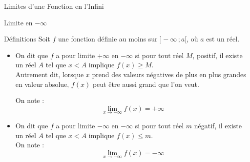 \documentclass{cours}
\begin{document}
\begin{Gpartie}{Limites d'une Fonction en l'Infini}
        \begin{Spartie}{Limite en $-\infty$} 
            \begin{SSpartie}{Définitions}
                Soit $f$ une fonction définie au moins sur $\big]-\infty\,;a\big[$, où $a$ est un réel.
                \begin{itemize}
                    \item   On dit que $f$ a pour limite $+\infty$ en $-\infty$ si pour tout réel $M$, positif, il existe un réel $A$ tel que $x<A$ implique $f(x)\geq M$. \\ Autrement dit, lorsque $x$ prend des valeurs négatives de plus en plus grandes en valeur absolue, $f(x)$ peut être aussi grand que l'on veut.
                    
                    On note : \[\boxed{\lim\limits_{x\to-\infty}f(x)=+\infty}\]
                    \begin{center}
                        \parbox{\linewidth}{}
                    \end{center}
                    \pagebreak
                    \item   On dit que $f$ a pour limite $-\infty$ en $-\infty$ si pour tout réel $m$ négatif, il existe un réel $A$ tel que $x<A$ implique $f(x)\leq m$. \\ On note : \[\boxed{\lim\limits_{x\to-\infty}f(x)=-\infty}\]
                    \begin{center}

\end{center}
\end{itemize}
\end{SSpartie}
\end{Spartie}
\end{Gpartie}
\end{document}
